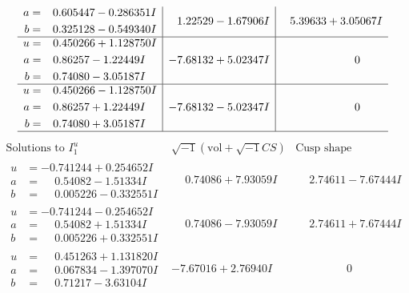 \documentclass[1p]{elsarticle_modified}
\theoremstyle{definition}
\newcommand{\I}{\sqrt{-1}}
\begin{document}
$$\begin{array}{c|c|c}
\begin{aligned}
a &= \phantom{-}0.605447 - 0.286351 I \\
b &= \phantom{-}0.325128 - 0.549340 I\end{aligned}
 & \phantom{-}1.22529 - 1.67906 I & \phantom{-}5.39633 + 3.05067 I \\ \hline\begin{aligned}
u &= \phantom{-}0.450266 + 1.128750 I \\
a &= \phantom{-}0.86257 - 1.22449 I \\
b &= \phantom{-}0.74080 - 3.05187 I\end{aligned}
 & -7.68132 + 5.02347 I & \phantom{-0.000000 } 0 \\ \hline\begin{aligned}
u &= \phantom{-}0.450266 - 1.128750 I \\
a &= \phantom{-}0.86257 + 1.22449 I \\
b &= \phantom{-}0.74080 + 3.05187 I\end{aligned}
 & -7.68132 - 5.02347 I & \phantom{-0.000000 } 0\\
 \hline 
 \end{array}$$\newpage$$\begin{array}{c|c|c}  
\text{Solutions to }I^u_{1}& \I (\text{vol} + \sqrt{-1}CS) & \text{Cusp shape}\\
 \hline 
\begin{aligned}
u &= -0.741244 + 0.254652 I \\
a &= \phantom{-}0.54082 - 1.51334 I \\
b &= \phantom{-}0.005226 - 0.332551 I\end{aligned}
 & \phantom{-}0.74086 + 7.93059 I & \phantom{-}2.74611 - 7.67444 I \\ \hline\begin{aligned}
u &= -0.741244 - 0.254652 I \\
a &= \phantom{-}0.54082 + 1.51334 I \\
b &= \phantom{-}0.005226 + 0.332551 I\end{aligned}
 & \phantom{-}0.74086 - 7.93059 I & \phantom{-}2.74611 + 7.67444 I \\ \hline\begin{aligned}
u &= \phantom{-}0.451263 + 1.131820 I \\
a &= \phantom{-}0.067834 - 1.397070 I \\
b &= \phantom{-}0.71217 - 3.63104 I\end{aligned}
 & -7.67016 + 2.76940 I & \phantom{-0.000000 } 0 \\ \hline\begin{aligned}

\end{aligned}
\end{array}$$
\end{document}
